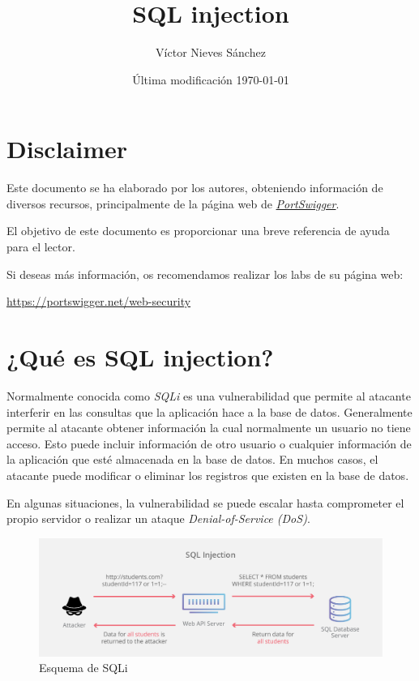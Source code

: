 \documentclass[bibliography=totocnumbered]{scrartcl}
\title{SQL injection}
\author{Víctor Nieves Sánchez}
\date{Última modificación \today{}}
\newcommand{\changeurlcolor}[1]{\hypersetup{urlcolor=#1}}
\begin{document}
\maketitle
\section*{Disclaimer}
Este documento se ha elaborado por los autores, obteniendo información de diversos recursos, principalmente de la página web de \changeurlcolor{blue}\href{https://portswigger.net/web-security}{\textit{PortSwigger}}.\

El objetivo de este documento es proporcionar una breve referencia de ayuda para el lector.\

Si deseas más información, os recomendamos realizar los labs de su página web:
\begin{center}
\changeurlcolor{blue}\href{https://portswigger.net/web-security}{https://portswigger.net/web-security}    
\end{center}

\newpage
\tableofcontents

\newpage
\listoffigures

\newpage

\section{¿Qué es SQL injection?}
Normalmente conocida como \textit{SQLi} es una vulnerabilidad que permite al atacante interferir en las consultas que la aplicación hace a la base de datos. Generalmente permite al atacante obtener información la cual normalmente un usuario no tiene acceso. Esto puede incluir información de otro usuario o cualquier información de la aplicación que esté almacenada en la base de datos. En muchos casos, el atacante puede modificar o eliminar los registros que existen en la base de datos.

En algunas situaciones, la vulnerabilidad se puede escalar hasta comprometer el propio servidor o realizar un ataque \textit{Denial-of-Service (DoS)}.

\begin{figure}[h]
  \includegraphics[width=\linewidth]{figures/SQLi.png}
  \caption{Esquema de SQLi}
  \label{fig:SQLi1}
\end{figure}
\end{document}
